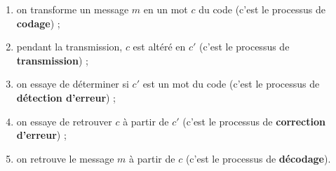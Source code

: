   \begin{enumerate}
    \item on transforme un message $m$ en un mot $c$ du code (c'est le processus de \textbf{codage}) ;
    \item pendant la transmission, $c$ est altéré en $c'$ (c'est le processus de \textbf{transmission}) ;
    \item on essaye de déterminer si $c'$ est un mot du code (c'est le processus de \textbf{détection d'erreur}) ;
    \item on essaye de retrouver $c$ à partir de $c'$ (c'est le processus de \textbf{correction d'erreur}) ;
    \item on retrouve le message $m$ à partir de $c$ (c'est le processus de \textbf{décodage}).
  \end{enumerate}

